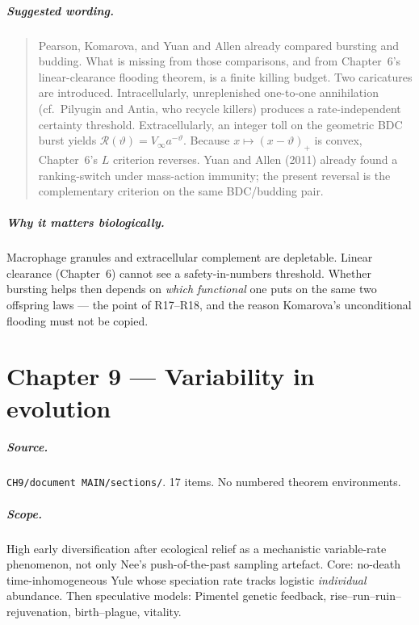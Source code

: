 \documentclass[11pt,a4paper]{report}
\begin{document}
\paragraph{Suggested wording.}
\begin{quote}
Pearson, Komarova, and Yuan and Allen already compared bursting and
budding. What is missing from those comparisons, and from Chapter~6's
linear-clearance flooding theorem, is a finite killing budget. Two
caricatures are introduced. Intracellularly, unreplenished one-to-one
annihilation (cf.\ Pilyugin and Antia, who recycle killers) produces a
rate-independent certainty threshold. Extracellularly, an integer toll
on the geometric BDC burst yields
\(\mathcal{R}(\vartheta)=V_\infty a^{-\vartheta}\). Because
\(x\mapsto(x-\vartheta)_+\) is convex, Chapter~6's \(L\) criterion
reverses. Yuan and Allen (2011) already found a ranking-switch under
mass-action immunity; the present reversal is the complementary
criterion on the same BDC/budding pair.
\end{quote}

\paragraph{Why it matters biologically.}
Macrophage granules and extracellular complement are depletable. Linear
clearance (Chapter~6) cannot see a safety-in-numbers threshold. Whether
bursting helps then depends on \emph{which functional} one puts on the
same two offspring laws --- the point of R17--R18, and the reason
Komarova's unconditional flooding must not be copied.

\chapter{Chapter 9 --- Variability in evolution}
\label{ch:9}

\paragraph{Source.} \texttt{CH9/document MAIN/sections/}. 17 items.
No numbered theorem environments.

\paragraph{Scope.}
High early diversification after ecological relief as a mechanistic
variable-rate phenomenon, not only Nee's push-of-the-past sampling
artefact. Core: no-death time-inhomogeneous Yule whose speciation rate
tracks logistic \emph{individual} abundance. Then speculative models:
Pimentel genetic feedback, rise--run--ruin--rejuvenation, birth--plague,
vitality.
\end{document}
